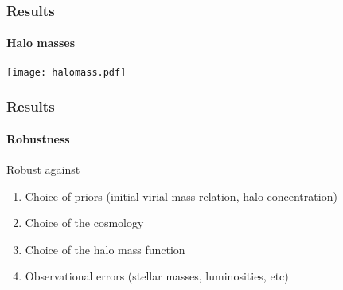 \begin{frame}
    \frametitle{Results}
    \framesubtitle{Halo masses}
    \centering
    \legend%
    \texttt{[image: halomass.pdf]}
\end{frame}

\begin{frame}
    \frametitle{Results}
    \framesubtitle{Robustness}
    \begin{block}{Robust against}
        \begin{enumerate}
            \item<1-> Choice of priors (initial virial mass relation, halo
                concentration)
            \item<2-> Choice of the cosmology
            \item<3-> Choice of the halo mass function
            \item<4-> Observational errors (stellar masses, luminosities, etc)
        \end{enumerate}
    \end{block}
\end{frame}


